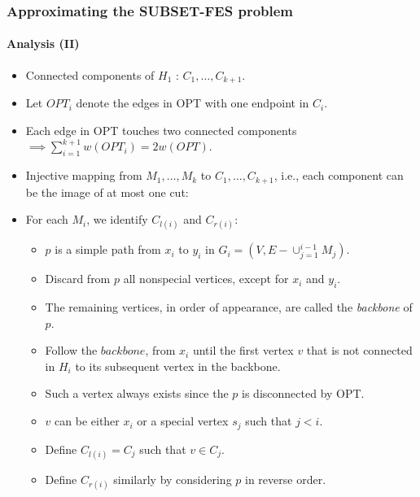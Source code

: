 \documentclass[10pt]{beamer}
\begin{document}
\begin{frame}
    \frametitle{Approximating the SUBSET-FES problem}
    \framesubtitle{Analysis (II)}
    \begin{itemize}
        \item Connected components of \(H_1\) : \(C_1, \ldots, C_{k+1}\).
        \item Let \(OPT_i\) denote the edges in OPT with one endpoint in \(C_i\).
        \item Each edge in OPT touches two connected components \(\implies \sum_{i=1}^{k+1}w(OPT_i) = 2w(OPT)\).
        \item Injective mapping from {\(M_1, \ldots, M_k\)} to \(C_1, \ldots, C_{k+1}\), i.e., each component can be the image of at most one cut:
        \item For each \(M_i\), we identify \(C_{l(i)}\) and \(C_{r(i)}\):
        \begin{itemize}
            \item \(p\) is  a simple path from \(x_i\) to \(y_i\) in \(G_i = (V, E - \cup_{j=1}^{i-1}M_j)\).
            \item Discard from \(p\) all nonspecial vertices, except for \(x_i\) and \(y_i\). 
            \item The remaining vertices, in order of appearance, are called the \textit{backbone} of \(p\).
            \item Follow the \(backbone\), from \(x_i\) until the first vertex \(v\) that is not connected in \(H_i\) to its subsequent vertex in the backbone.
            \item Such a vertex always exists since the \(p\) is disconnected by OPT.
            \item \(v\) can be either \(x_i\) or a special vertex \(s_j\) such that \(j < i\).
            \item Define \(C_{l(i)} = C_j\) such that \(v \in C_j\).
            \item Define \(C_{r(i)}\) similarly by considering \(p\) in reverse order.
        \end{itemize}
    \end{itemize}
\end{frame}
\end{document}

